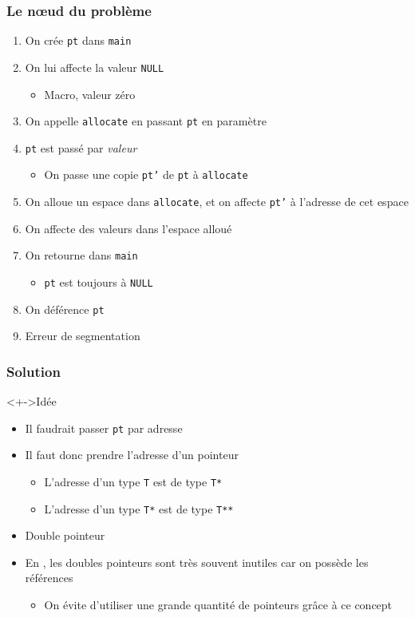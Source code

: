 \begin{frame}[<+->]
\frametitle{Le nœud du problème}
\begin{enumerate}[<+->]
\item On crée \texttt{pt} dans \texttt{main}
\item On lui affecte la valeur \texttt{NULL}
	\begin{itemize}
	\item Macro, valeur zéro
	\end{itemize}
\item On appelle \texttt{allocate} en passant \texttt{pt} en paramètre
\item \texttt{pt} est passé par \emph{valeur}
	\begin{itemize}
	\item On passe une copie \texttt{pt'} de \texttt{pt} à \texttt{allocate}
	\end{itemize}
\item On alloue un espace dans \texttt{allocate}, et on affecte \texttt{pt'} à l'adresse de cet espace
\item On affecte des valeurs dans l'espace alloué
\item On retourne dans \texttt{main}
	\begin{itemize}
	\item \texttt{pt} est toujours à \texttt{NULL}
	\end{itemize}
\item On déférence \texttt{pt}
\item Erreur de segmentation
\end{enumerate}
\end{frame}

\begin{frame}
\frametitle{Solution}
\begin{exampleblock}<+->{Idée}
	\begin{itemize}[<+->]
	\item Il faudrait passer \texttt{pt} par adresse
	\end{itemize}
\end{exampleblock}
\begin{itemize}[<+->]
\item Il faut donc prendre l'adresse d'un pointeur
	\begin{itemize}
	\item L'adresse d'un type \texttt{T} est de type \texttt{T*}
	\item L'adresse d'un type \texttt{T*} est de type \texttt{T**}
	\end{itemize}
\item Double pointeur
\item En \cpp, les doubles pointeurs sont très souvent inutiles car on possède les références
	\begin{itemize}
	\item On évite d'utiliser une grande quantité de pointeurs grâce à ce concept
	\end{itemize}
\end{itemize}
\end{frame}

